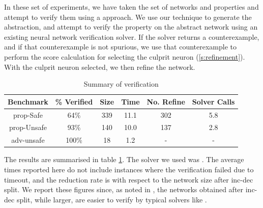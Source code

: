 

In these set of experiments, we have taken the \acasxu set of
networks  and
properties and attempt to verify them using a \cegar approach. We use our
technique to generate the abstraction, and attempt to verify the property on the
abstract network using an existing neural network verification solver. If the
solver returns a counterexample, and if that counterexample is not spurious, we
use that counterexample to perform the score calculation for selecting
the culprit neuron (\ref{s:refinement}). With the culprit neuron selected, we
then refine the network.

\begin{table}
\footnotesize
\begin{tabular}{ |c|c|c|c|c|c| }
\hline
Benchmark   & \% Verified & Size     & Time    & No. Refine & Solver Calls \\ 
\hline
prop-Safe   &   64\%      & 339      & 11.1    & 302        & 5.8      \\
prop-Unsafe &   93\%      & 140      & 10.0    & 137        & 2.8      \\
adv-unsafe  &  100\%      & 18       & 1.2     & -          & -        \\
\hline                                                                
\end{tabular}
\caption{Summary of \acasxu verification }
\label{t:acas-summary}
\end{table}

The results are summarised in table \ref{t:acas-summary}. The solver we used was
\abcrown. The average times reported here do not include instances where the
verification failed due to timeout, and the reduction rate is with respect to
the network size after inc-dec split. We report these figures since, as noted in
\cite{cegar-nn}, the networks obtained after inc-dec split, while larger, are
easier to verify by typical solvers like \marabou.

